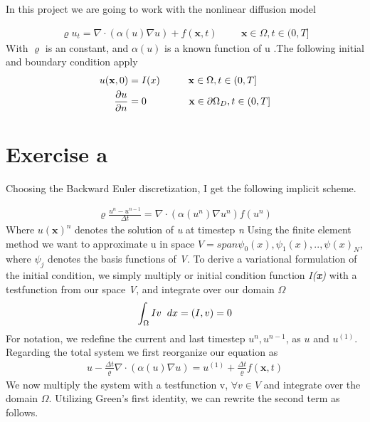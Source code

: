\documentclass[a4paper,norsk]{article}
\begin{document}
\maketitle
In this project we are going to work with the nonlinear diffusion model

\begin{align}
\varrho u_t = \nabla \cdot (\alpha(u) \nabla u) + f(\textbf{x},t)
\hspace{1cm} \textbf{x} \in \Omega, t \in (0, T]
\end{align}
With $\varrho$ is an constant, and $\alpha(u)$ is a known function of u
.The following initial and boundary condition apply
\begin{align}
u(\textbf{x},0) &= I(x) \hspace{1cm} \textbf{x} \in \Omega, t \in (0, T] \\
\frac{\partial u}{\partial n} &= 0 \hspace{1.5cm} \textbf{x} \in \partial\Omega_D, t \in (0, T]
\end{align}

\section*{Exercise a}
Choosing the Backward Euler discretization, I get the following implicit scheme. 

\begin{align}
\varrho \frac{u^n - u^{n-1}}{\Delta t} = 
\nabla \cdot (\alpha(u^n) \nabla u^n) f(u^n)
\end{align}
Where $u(\textbf{x})^n$ denotes the solution of \textit{u} at timestep \textit{n}
Using the finite element method we want to approximate u in space  
$V = span{\psi_0(x),\psi_1(x),..,\psi(x)_N}$, where $\psi_j$ denotes the basis functions of \textit{V}. To derive a 
variational formulation of the initial condition, we simply multiply or initial condition function \textit{I(\textbf{x})} with a testfunction from our space \textit{V}, and integrate over our domain $\Omega$
\begin{align}
\int_\Omega I v \hspace{2mm}dx = (I,v) = 0
\end{align}
For notation, we redefine the current and last timestep $u^n, u^{n-1}$, as ${u}$ and $u^{(1)}$.
Regarding the total system we first reorganize our equation as
\begin{align}
u - \frac{\Delta t}{\varrho} \nabla \cdot (\alpha(u)\nabla u ) =
u^{(1)} + \frac{\Delta t}{\varrho} f(\textbf{x}, t)
\end{align}
We now multiply the system with a testfunction v, $\forall v \in V$ and integrate over the domain $\Omega$. Utilizing Green's first identity, we can rewrite the second term as follows.
\end{document}
